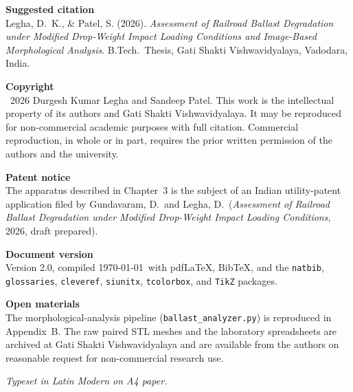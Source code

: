 \thispagestyle{empty}
\setlength{\parindent}{0pt}
\null\vspace*{1cm}

\begin{center}
\begin{minipage}{0.86\textwidth}

\footnotesize\sffamily\setlength{\parskip}{8pt}

\textbf{\color{gsvblue}Suggested citation}\\[1pt]
{\normalfont
Legha, D.~K., \& Patel, S. (2026). \emph{Assessment of Railroad Ballast
Degradation under Modified Drop-Weight Impact Loading Conditions and
Image-Based Morphological Analysis}. B.Tech.\ Thesis, Gati Shakti
Vishwavidyalaya, Vadodara, India.}

\textbf{\color{gsvblue}Copyright}\\[1pt]
{\normalfont
\textcopyright\ 2026 Durgesh Kumar Legha and Sandeep Patel.
This work is the intellectual property of its authors and Gati Shakti
Vishwavidyalaya. It may be reproduced for non-commercial academic
purposes with full citation. Commercial reproduction, in whole or in
part, requires the prior written permission of the authors and the
university.}

\textbf{\color{gsvblue}Patent notice}\\[1pt]
{\normalfont
The apparatus described in Chapter~3 is the subject of an Indian
utility-patent application filed by Gundavaram, D.\ and Legha, D.\
(\textit{Assessment of Railroad Ballast Degradation under Modified
Drop-Weight Impact Loading Conditions}, 2026, draft prepared).}

\textbf{\color{gsvblue}Document version}\\[1pt]
{\normalfont
Version 2.0, compiled \today\ with pdf\LaTeX, BibTeX, and the
\texttt{natbib}, \texttt{glossaries}, \texttt{cleveref},
\texttt{siunitx}, \texttt{tcolorbox}, and \texttt{TikZ} packages.}

\textbf{\color{gsvblue}Open materials}\\[1pt]
{\normalfont
The morphological-analysis pipeline (\texttt{ballast\_analyzer.py}) is
reproduced in Appendix~B. The raw paired \gls{STL} meshes and the
laboratory spreadsheets are archived at Gati Shakti Vishwavidyalaya
and are available from the authors on reasonable request for
non-commercial research use.}

\vspace{14pt}
\centering\itshape\color{gsvblue!80}Typeset in Latin Modern on A4 paper.

\end{minipage}
\end{center}
\vspace*{\fill}
\cleardoublepage

